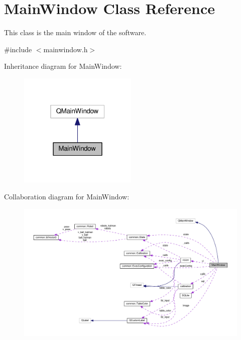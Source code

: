 \hypertarget{classMainWindow}{}\section{Main\+Window Class Reference}
\label{classMainWindow}


This class is the main window of the software.  




{\ttfamily \#include $<$mainwindow.\+h$>$}



Inheritance diagram for Main\+Window\+:
\nopagebreak
\begin{figure}[H]
\begin{center}
\leavevmode
\includegraphics[width=160pt]{classMainWindow__inherit__graph}
\end{center}
\end{figure}


Collaboration diagram for Main\+Window\+:
\nopagebreak
\begin{figure}[H]
\begin{center}
\leavevmode
\includegraphics[width=350pt]{classMainWindow__coll__graph}
\end{center}
\end{figure}

